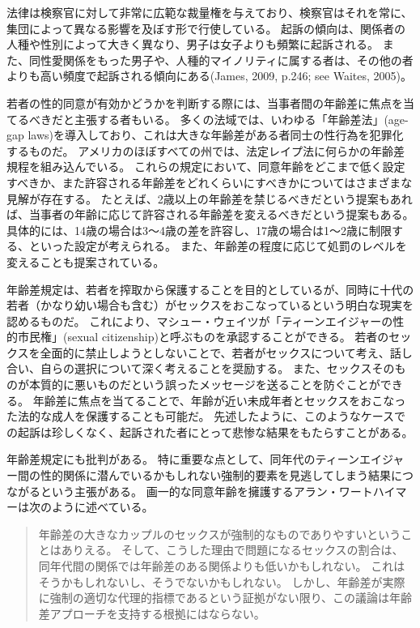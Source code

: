 \documentclass[paper=a4,book,openany]{jlreq}
\begin{document}
法律は検察官に対して非常に広範な裁量権を与えており、検察官はそれを常に、集団によって異なる影響を及ぼす形で行使している。
起訴の傾向は、関係者の人種や性別によって大きく異なり、男子は女子よりも頻繁に起訴される。
また、同性愛関係をもった男子や、人種的マイノリティに属する者は、その他の者よりも高い頻度で起訴される傾向にある(James, 2009, p.246; see Waites, 2005)。
\nocite{james09:_romeo_juliet_were_sex_offen}\nocite{waites04:_age_consen_sexual_consen}

若者の性的同意が有効かどうかを判断する際には、当事者間の年齢差に焦点を当てるべきだと主張する者もいる。
多くの法域では、いわゆる「年齢差法」(age-gap laws)を導入しており、これは大きな年齢差がある者同士の性行為を犯罪化するものだ。
アメリカのほぼすべての州では、法定レイプ法に何らかの年齢差規程を組み込んでいる。
これらの規定において、同意年齢をどこまで低く設定すべきか、また許容される年齢差をどれくらいにすべきかについてはさまざまな見解が存在する。
たとえば、2歳以上の年齢差を禁じるべきだという提案もあれば\citep{waites04:_age_consen_sexual_consen}、当事者の年齢に応じて許容される年齢差を変えるべきだという提案もある。
具体的には、14歳の場合は3～4歳の差を許容し、17歳の場合は1～2歳に制限する、といった設定が考えられる。
また、年齢差の程度に応じて処罰のレベルを変えることも提案されている。

年齢差規定は、若者を搾取から保護することを目的としているが、同時に十代の若者（かなり幼い場合も含む）がセックスをおこなっているという明白な現実を認めるものだ。
これにより、マシュー・ウェイツが「ティーンエイジャーの性的市民権」(sexual citizenship)と呼ぶものを承認することができる。
若者のセックスを全面的に禁止しようとしないことで、若者がセックスについて考え、話し合い、自らの選択について深く考えることを奨励する。
また、セックスそのものが本質的に悪いものだという誤ったメッセージを送ることを防ぐことができる。
年齢差に焦点を当てることで、年齢が近い未成年者とセックスをおこなった法的な成人を保護することも可能だ。
先述したように、このようなケースでの起訴は珍しくなく、起訴された者にとって悲惨な結果をもたらすことがある。

年齢差規定にも批判がある。
特に重要な点として、同年代のティーンエイジャー間の性的関係に潜んでいるかもしれない強制的要素を見逃してしまう結果につながるという主張がある。
画一的な同意年齢を擁護するアラン・ワートハイマーは次のように述べている。

\begin{quote}
年齢差の大きなカップルのセックスが強制的なものでありやすいということはありえる。
そして、こうした理由で問題になるセックスの割合は、同年代間の関係では年齢差のある関係よりも低いかもしれない。
これはそうかもしれないし、そうでないかもしれない。
しかし、年齢差が実際に強制の適切な代理的指標であるという証拠がない限り、この議論は年齢差アプローチを支持する根拠にはならない。
\citep[p.218]{wertheimer03:_consen_sexual_relat}
\end{quote}
\end{document}
